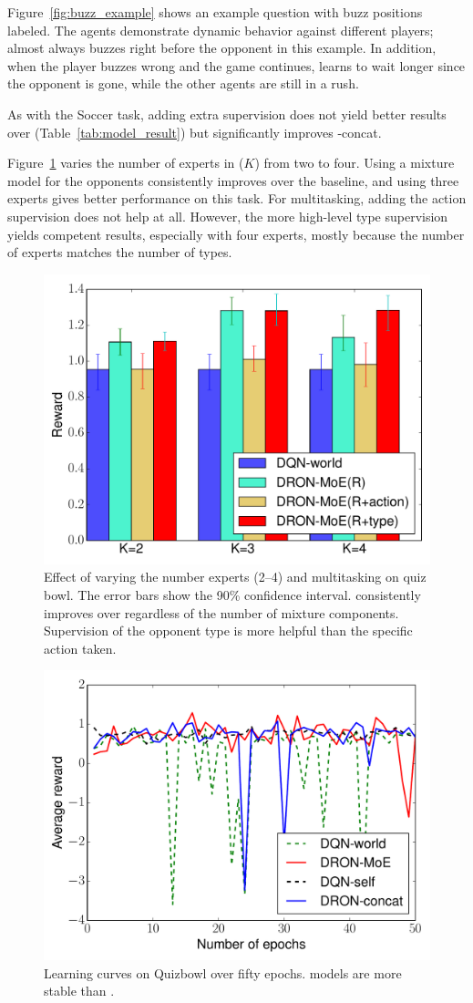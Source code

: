Figure~\ref{fig:buzz_example} shows an example question with buzz positions labeled.
The \dron{} agents demonstrate dynamic behavior against different players;
\dronmoe{} almost always buzzes right before the opponent in this example.
In addition, when the player buzzes wrong and the game continues, \dronmoe{} learns to wait longer since the opponent is gone, while the other agents are still in a rush.

As with the Soccer task,
adding extra supervision does not yield better results over \dronmoe{}
(Table~\ref{tab:model_result}) but significantly improves
\dron{}-concat.




Figure~\ref{fig:qb_moe_bar} varies the number of experts in \dronmoe{}
($K$) from two to four.  Using a mixture model for the opponents
consistently improves over the \dqn{} baseline, and using three
experts gives better performance on this task.  For multitasking,
adding the action supervision does not help at all.  However, the more
high-level type supervision yields competent results, especially with
four experts, mostly because the number of experts matches the
number of types.

\begin{figure}
\centering
\includegraphics[width=0.6\linewidth]{2016_icml_opponent/figures/qb_moe_bar}
\caption{Effect of varying the number experts (2--4) and multitasking on quiz bowl.  The
  error bars show the 90\% confidence interval.  \dronmoe{} consistently
  improves over \dqn{} regardless of the number of mixture components.
  Supervision of the opponent type is more helpful than the specific
  action taken.  }

\label{fig:qb_moe_bar}
\end{figure}

\begin{figure}
\centering
\includegraphics[width=0.6\linewidth]{2016_icml_opponent/figures/qb_all_test_rewards}
\caption{Learning curves on Quizbowl over fifty epochs. \dron{} models are more
  stable than \dqn{}.}
\label{fig:qb_all_test_rewards}
\end{figure}